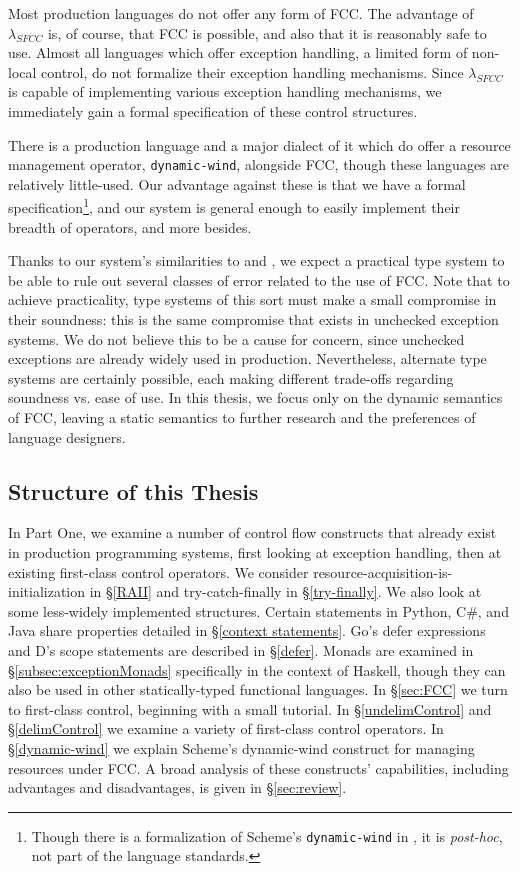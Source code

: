 \documentclass[11pt]{article}
\newcommand{\maybePage}{\null}
\begin{document}
Most production languages do not offer any form of FCC.
The advantage of $\lambda_{SFCC}$ is, of course, that FCC is possible, and also that it is reasonably safe to use.
Almost all languages which offer exception handling, a limited form of non-local control, do not formalize their exception handling mechanisms.
Since $\lambda_{SFCC}$ is capable of implementing various exception handling mechanisms, we immediately gain a formal specification of these control structures.

There is a production language and a major dialect of it which do offer a resource management operator, \texttt{dynamic-wind}, alongside FCC, though these languages are relatively little-used.
Our advantage against these is that we have a formal specification\footnote{Though there is a formalization of Scheme's \texttt{dynamic-wind} in \cite{SchemeOpSem}, it is \textit{post-hoc}, not part of the language standards.}, and our system is general enough to easily implement their breadth of operators, and more besides.

Thanks to our system's similarities to \cite{Gunter:1995} and \cite{MFDC}, we expect a practical type system to be able to rule out several classes of error related to the use of FCC.
Note that to achieve practicality, type systems of this sort must make a small compromise in their soundness: this is the same compromise that exists in unchecked exception systems.
We do not believe this to be a cause for concern, since unchecked exceptions are already widely used in production.
Nevertheless, alternate type systems are certainly possible, each making different trade-offs regarding soundness vs. ease of use.
In this thesis, we focus only on the dynamic semantics of FCC, leaving a static semantics to further research and the preferences of language designers.

\maybePage
\subsection{Structure of this Thesis}

In Part One, we examine a number of control flow constructs that already exist in production programming systems, first looking at exception handling, then at existing first-class control operators.
We consider resource-acquisition-is-initialization in \S\ref{RAII} and try-catch-finally in \S\ref{try-finally}.
We also look at some less-widely implemented structures.
Certain statements in Python, C\#, and Java share properties detailed in \S\ref{context statements}.
Go's defer expressions and D's scope statements are described in \S\ref{defer}.
Monads are examined in \S\ref{subsec:exceptionMonads} specifically in the context of Haskell, though they can also be used in other statically-typed functional languages.
In \S\ref{sec:FCC} we turn to first-class control, beginning with a small tutorial.
In \S\ref{undelimControl} and \S\ref{delimControl} we examine a variety of first-class control operators.
In \S\ref{dynamic-wind} we explain Scheme's dynamic-wind construct for managing resources under FCC.
A broad analysis of these constructs' capabilities, including advantages and disadvantages, is given in \S\ref{sec:review}.
\end{document}

